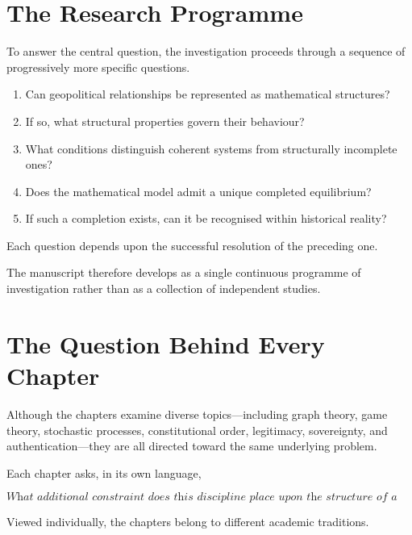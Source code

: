 \documentclass[11pt,openany]{book}
\theoremstyle{plain}
\theoremstyle{definition}
\begin{document}
\section*{The Research Programme}

To answer the central question, the investigation proceeds through a sequence of progressively more specific questions.

\begin{enumerate}

\item Can geopolitical relationships be represented as mathematical structures?

\item If so, what structural properties govern their behaviour?

\item What conditions distinguish coherent systems from structurally incomplete ones?

\item Does the mathematical model admit a unique completed equilibrium?

\item If such a completion exists, can it be recognised within historical reality?

\end{enumerate}

Each question depends upon the successful resolution of the preceding one.

The manuscript therefore develops as a single continuous programme of investigation rather than as a collection of independent studies.


\section*{The Question Behind Every Chapter}

Although the chapters examine diverse topics—including graph theory, game theory, stochastic processes, constitutional order, legitimacy, sovereignty, and authentication—they are all directed toward the same underlying problem.

Each chapter asks, in its own language,

\[
\boxed{
\textit{
What additional constraint does this discipline place upon the structure of a coherent geopolitical order?
}
}
\]

Viewed individually, the chapters belong to different academic traditions.
\end{document}
